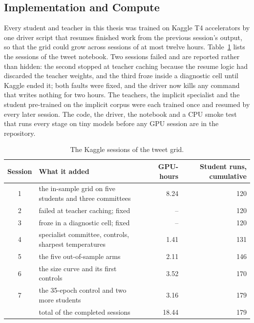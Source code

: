 \subsection{Implementation and Compute}
\label{sec:4.8}
Every student and teacher in this thesis was trained on Kaggle T4 accelerators by one driver script that
resumes finished work from the previous session's output, so that the grid could grow across sessions
of at most twelve hours. Table~\ref{tab:sessions} lists the sessions of the tweet notebook. Two sessions
failed and are reported rather than hidden: the second stopped at teacher caching because the resume
logic had discarded the teacher weights, and the third froze inside a diagnostic cell until Kaggle ended
it; both faults were fixed, and the driver now kills any command that writes nothing for two hours. The
teachers, the implicit specialist and the student pre-trained on the implicit corpus were each trained
once and resumed by every later session. The code, the driver, the notebook and a CPU smoke test that runs
every stage on tiny models before any GPU session are in the repository.

\begin{table}[htbp]
\centering
\small
\caption{The Kaggle sessions of the tweet grid.}
\label{tab:sessions}
\begin{tabular}{clrr}
\toprule
Session & What it added & GPU-hours & Student runs, cumulative \\
\midrule
1 & the in-sample grid on five students and three committees & 8.24 & 120 \\
2 & failed at teacher caching; fixed & -- & 120 \\
3 & froze in a diagnostic cell; fixed & -- & 120 \\
4 & specialist committee, controls, sharpest temperatures & 1.41 & 131 \\
5 & the five out-of-sample arms & 2.11 & 146 \\
6 & the size curve and its first controls & 3.52 & 170 \\
7 & the 35-epoch control and two more students & 3.16 & 179 \\
\midrule
 & total of the completed sessions & 18.44 & 179 \\
\bottomrule
\end{tabular}
\end{table}
